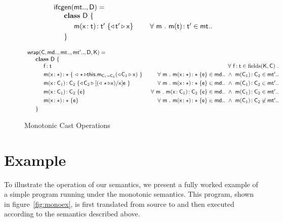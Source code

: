 \documentclass[sigconf]{acmart}
\begin{document}
\begin{figure*}
\vspace{5mm}

\begin{center}\begin{minipage}{12cm}
\noindent\[\begin{array}{l@{~}r@{}r@{~}r@{~}r@{~}rr}
\arrayrulecolor{white}
\typegen{\mt..}{\D} = \\
\SP \class~\D~\{
\\[1mm]
\SPP \Mdef\m\x\t\tp {{\MonCast\tp{\x}}} 
&
\qquad \All m \Mtype\m\t\tp\in\mt..
\\[1mm]
\SP\}
\end{array}
\]

\vspace{5mm}

\[\begin{array}{l@{~}r@{}r@{~}r@{~}r@{~}rr}
\arrayrulecolor{white}
\classgen{\C, \md.., \mt.., \mtp.., \D, \K}= \\
  \SP \class~\D~\{ \\
    \SPP \Fdef\f\t   &
        \All{\f\!:\t\in\text{fields}(\K,\C)} \\[1mm]
    \SPP \Mdef\m\x\any\any{~\MonCast\any{\KCall\this\m{\MonCast{\C_1}\x}{\C_1}{\C_2}}~}\HS\HS & 
          \All\m \Mdef\m\x{\any}{\any}\e\in\md..  ~\AND~ \Mtype\m{\C_1}{\C_2}\in{\mtp..}
\\[1mm]\hline
\SPP \Mdef\m\x{\C_1}{\C_2} {\MonCast{\C_2}{[{(\MonCast{\any}\x)}/\x]\e}~}
&     \All \m \Mdef\m\x{\any}{\any}\e\in\md.. ~\AND~ \Mtype\m{\C_1}{\C_2}\in\mtp.. 
\\[1mm]\hline
\SPP \Mdef\m\x{\C_1}{\C_2} {\e}~
&     \All \m \Mdef\m\x{\C_1}{\C_2}\e\in\md.. ~\AND~ \Mtype\m{\C_1}{\C_2}\in\mtp.. 
\\[1mm]\hline
\SPP \Mdef\m\x{\any}{\any} {\e}~
&     \All \m \Mdef\m\x{\any}{\any}\e\in\md.. ~\AND~ \Mtype\m{\C_1}{\C_2}\not\in\mtp.. 
\\[1mm]\hline
\SP\}
\end{array}
\]\end{minipage}\end{center}
\caption{Monotonic Cast Operations}
\label{moncast}
\end{figure*}

\section{Example}

To illustrate the operation of our semantics, we present a fully worked
example of a simple program running under the monotonic semantics. This
program, shown in figure~\ref{fig:monoex}, is first translated from source
to \kafka and then executed according to the \kafka semantics described
above.
\end{document}
